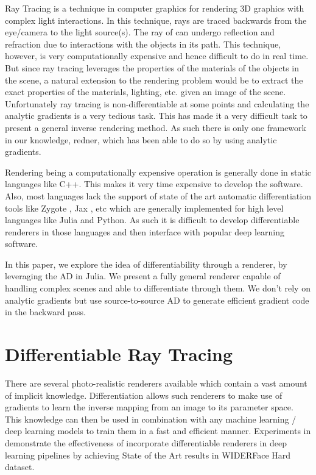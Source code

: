 \documentclass{juliacon}
\begin{document}
Ray Tracing is a technique in computer graphics for rendering 3D graphics with complex light interactions. In this technique, rays are traced backwards from the eye/camera to the light source(s). The ray of can undergo reflection and refraction due to interactions with the objects in its path. This technique, however, is very computationally expensive and hence difficult to do in real time. But since ray tracing leverages the properties of the materials of the objects in the scene, a natural extension to the rendering problem would be to extract the exact properties of the materials, lighting, etc. given an image of the scene. Unfortunately ray tracing is non-differentiable at some points and calculating the analytic gradients is a very tedious task. This has made it a very difficult task to present a general inverse rendering method. As such there is only one framework in our knowledge, redner\cite{Li:2018:DMC}, which has been able to do so by using analytic gradients.

Rendering being a computationally expensive operation is generally done in static languages like C++. This makes it very time expensive to develop the software. Also, most languages lack the support of state of the art automatic differentiation tools like Zygote \cite{DBLP:journals/corr/abs-1810-07951}, Jax \cite{jax}, etc which are generally implemented for high level languages like Julia and Python. As such it is difficult to develop differentiable renderers in those languages and then interface with popular deep learning software.

In this paper, we explore the idea of differentiability through a renderer, by leveraging the AD in Julia\cite{bezanson2017julia}. We present a fully general renderer capable of handling complex scenes and able to differentiate through them. We don't rely on analytic gradients but use source-to-source AD to generate efficient gradient code in the backward pass.

\section{Differentiable Ray Tracing}

There are several photo-realistic renderers available which contain a vast amount of implicit knowledge. Differentiation allows such renderers to make use of gradients to learn the inverse mapping from an image to its parameter space. This knowledge can then be used in combination with any machine learning / deep learning models to train them in a fast and efficient manner. Experiments in \cite{retinaface} demonstrate the effectiveness of incorporate differentiable renderers in deep learning pipelines by achieving State of the Art results in WIDERFace Hard dataset.
\end{document}
